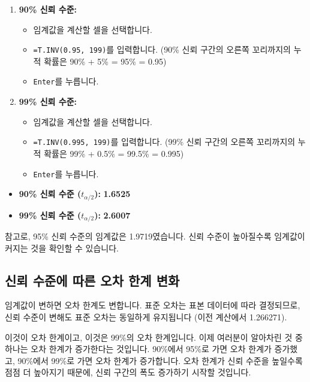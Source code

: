 \documentclass[11pt,a4paper]{book}
\theoremstyle{definition}
\begin{document}
\begin{enumerate}
    \item \textbf{90\% 신뢰 수준:}
        \begin{itemize}
            \item 임계값을 계산할 셀을 선택합니다.
            \item \texttt{=T.INV(0.95, 199)}를 입력합니다. (90\% 신뢰 구간의 오른쪽 꼬리까지의 누적 확률은 90\% + 5\% = 95\% = 0.95)
            \item \texttt{Enter}를 누릅니다.
        \end{itemize}
    \item \textbf{99\% 신뢰 수준:}
        \begin{itemize}
            \item 임계값을 계산할 셀을 선택합니다.
            \item \texttt{=T.INV(0.995, 199)}를 입력합니다. (99\% 신뢰 구간의 오른쪽 꼬리까지의 누적 확률은 99\% + 0.5\% = 99.5\% = 0.995)
            \item \texttt{Enter}를 누릅니다.
        \end{itemize}
\end{enumerate}
\begin{infobox}[title=계산 결과: 신뢰 수준별 t-분포 임계값]
\begin{itemize}
    \item \textbf{90\% 신뢰 수준 ($t_{\alpha/2}$):} \textbf{1.6525}
    \item \textbf{99\% 신뢰 수준 ($t_{\alpha/2}$):} \textbf{2.6007}
\end{itemize}
참고로, 95\% 신뢰 수준의 임계값은 1.9719였습니다. 신뢰 수준이 높아질수록 임계값이 커지는 것을 확인할 수 있습니다.
\end{infobox}

\subsection{신뢰 수준에 따른 오차 한계 변화}

임계값이 변하면 오차 한계도 변합니다. 표준 오차는 표본 데이터에 따라 결정되므로, 신뢰 수준이 변해도 표준 오차는 동일하게 유지됩니다 (이전 계산에서 1.266271).

\begin{tcolorbox}[title={슬라이드 61: 뉴욕 일일 기온 샘플 Excel 시트 (8/13)}]
이것이 오차 한계이고, 이것은 99\%의 오차 한계입니다. 이제 여러분이 알아차린 것 중 하나는 오차 한계가 증가한다는 것입니다. 90\%에서 95\%로 가면 오차 한계가 증가했고, 90\%에서 99\%로 가면 오차 한계가 증가합니다. 오차 한계가 신뢰 수준을 높일수록 점점 더 높아지기 때문에, 신뢰 구간의 폭도 증가하기 시작할 것입니다.
\end{tcolorbox}
\end{document}
